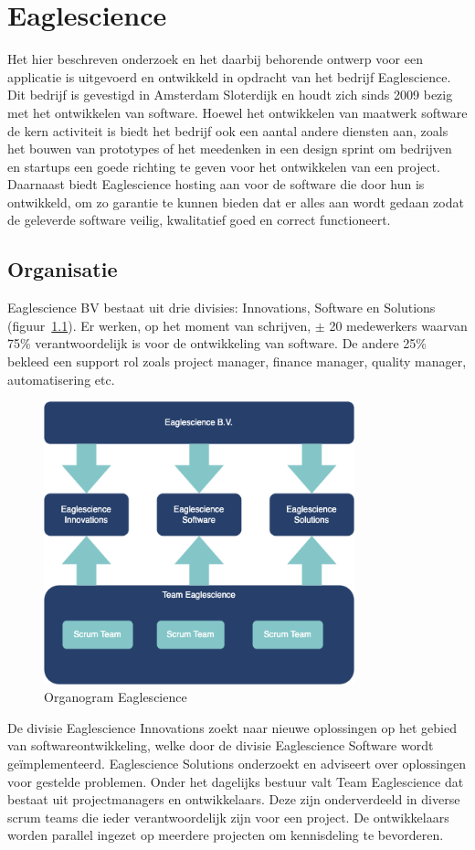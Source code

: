 \chapter{Eaglescience}\label{ch:Eaglescience} %

Het hier beschreven onderzoek en het daarbij behorende ontwerp voor een applicatie is uitgevoerd en ontwikkeld in opdracht van het bedrijf Eaglescience. Dit bedrijf is gevestigd in Amsterdam Sloterdijk en houdt zich sinds 2009 bezig met het ontwikkelen van software. Hoewel het ontwikkelen van maatwerk software de kern activiteit is biedt het bedrijf ook een aantal andere diensten aan, zoals het bouwen van prototypes of het meedenken in een design sprint om bedrijven en startups een goede richting te geven voor het ontwikkelen van een project. Daarnaast biedt Eaglescience hosting aan voor de software die door hun is ontwikkeld, om zo garantie te kunnen bieden dat er alles aan wordt gedaan zodat de geleverde software veilig, kwalitatief goed en correct functioneert.

\section{Organisatie}\label{sec:organisatie}
Eaglescience BV bestaat uit drie divisies: Innovations, Software en Solutions (figuur~\ref{fig:Eaglescience organogram}). Er werken, op het moment van schrijven, $\pm$ 20 medewerkers waarvan 75\% verantwoordelijk is voor de ontwikkeling van software. De andere 25\% bekleed een support rol zoals project manager, finance manager, quality manager, automatisering etc.

\begin{figure}[bth]
\myfloatalign
\includegraphics[width=9cm]{gfx/organogram}
\caption{Organogram Eaglescience}
\label{fig:Eaglescience organogram}
\end{figure}
De divisie Eaglescience Innovations zoekt naar nieuwe oplossingen op het gebied van softwareontwikkeling, welke door de divisie Eaglescience Software wordt geïmplementeerd. Eaglescience Solutions onderzoekt en adviseert over oplossingen voor gestelde problemen. Onder het dagelijks bestuur valt Team Eaglescience dat bestaat uit projectmanagers en ontwikkelaars. Deze zijn onderverdeeld in diverse scrum teams die ieder verantwoordelijk zijn voor een project. De ontwikkelaars worden parallel ingezet op meerdere projecten om kennisdeling te bevorderen.


